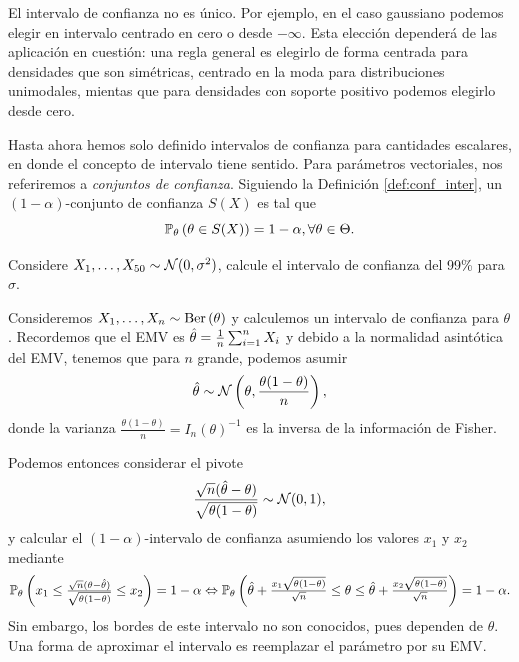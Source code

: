 \begin{example}
	 \begin{remark}
	 	El intervalo de confianza no es único. Por ejemplo, en el caso gaussiano podemos elegir en intervalo centrado en cero o desde $-\infty$. Esta elección dependerá de las aplicación en cuestión: una regla general es elegirlo de forma centrada para densidades que son simétricas, centrado en la moda para distribuciones unimodales, mientas que para densidades con soporte positivo podemos elegirlo desde cero. 
	 \end{remark}

	 Hasta ahora hemos solo definido intervalos de confianza para cantidades escalares, en donde el concepto de intervalo tiene sentido. Para parámetros vectoriales, nos referiremos a  \textit{conjuntos de confianza}. Siguiendo la Definición \ref{def:conf_inter}, un $(1-\alpha)$-conjunto de confianza $S(X)$ es tal que 
	 \begin{equation}
	\label{eq:conf_set}
	\mathbb{P}_\theta \left(\theta\in S(X)\right) = 1-\alpha, \forall \theta\in\Theta.
\end{equation}
\end{example}


\begin{exercise}
Considere $X_1,\ldots,X_{50}\sim{\mathcal N}(0,\sigma^2)$, calcule el intervalo de confianza del 99\% para $\sigma$.
\end{exercise}

\begin{example} Consideremos $X_1,\ldots,X_{n}\sim\text{Ber}\left(\theta\right)$ y calculemos un intervalo de confianza para $\theta$. Recordemos que el EMV es ${\hat\theta} = \frac{1}{n}\sum_{i=1}^nX_i$ y debido a la normalidad asintótica del EMV, tenemos que para $n$ grande, podemos asumir 
\begin{equation}
	{\hat\theta}\sim{\mathcal N}\left(\theta,\frac{\theta(1-\theta)}{n}\right),
\end{equation}
donde la varianza $\frac{\theta(1-\theta)}{n}=I_n(\theta)^{-1}$ es la inversa de la información de Fisher. 

Podemos entonces considerar el pivote
\begin{equation}
	\frac{\sqrt{n}({\hat\theta}-\theta)}{\sqrt{\theta(1-\theta)}}\sim{\mathcal N}(0,1),
\end{equation}
y calcular el $(1-\alpha)$-intervalo de confianza asumiendo los valores $x_1$ y $x_2$ mediante 
\begin{align*}
	\mathbb{P}_\theta \left(x_1 \leq \tfrac{\sqrt{n}(\theta-{\hat\theta})}{\sqrt{\theta(1-\theta)}} \leq x_2\right) = 1-\alpha \Leftrightarrow \mathbb{P}_\theta \left({\hat\theta} + \tfrac{x_1\sqrt{\theta(1-\theta)}}{\sqrt{n}} \leq \theta \leq {\hat\theta} + \tfrac{x_2\sqrt{\theta(1-\theta)}}{\sqrt{n}}\right) = 1-\alpha.
\end{align*}
Sin embargo, los bordes de este intervalo no son conocidos, pues dependen de $\theta$. Una forma de aproximar el intervalo es reemplazar el parámetro por su EMV. 
\end{example}


